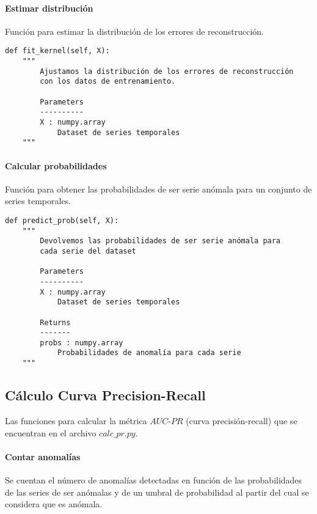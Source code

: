 \paragraph{Estimar distribución}

Función para estimar la distribución de los errores de reconstrucción.

\begin{lstlisting}
def fit_kernel(self, X):
    """
        Ajustamos la distribución de los errores de reconstrucción
        con los datos de entrenamiento.

        Parameters
        ----------
        X : numpy.array
            Dataset de series temporales
    """
\end{lstlisting}

\paragraph{Calcular probabilidades}

Función para obtener las probabilidades de ser serie anómala para un conjunto de series temporales.

\begin{lstlisting}
def predict_prob(self, X):
    """
        Devolvemos las probabilidades de ser serie anómala para
        cada serie del dataset

        Parameters
        ----------
        X : numpy.array
            Dataset de series temporales

        Returns
        -------
        probs : numpy.array
            Probabilidades de anomalía para cada serie
    """
\end{lstlisting}

\subsection{Cálculo Curva Precision-Recall}

Las funciones para calcular la métrica $AUC$-$PR$ (curva precisión-recall) que se encuentran en el archivo $calc\_pr.py$.

\paragraph{Contar anomalías}

Se cuentan el número de anomalías detectadas en función de las probabilidades de las series de ser anómalas y de un umbral de probabilidad al partir del cual se considera que es anómala.

